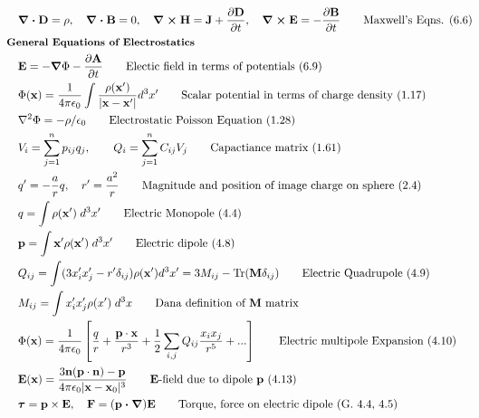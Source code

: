\documentclass[10pt]{article}
\newcommand{\ve}[1]{\boldsymbol{\mathbf{#1}}}
\newcommand{\vect}[1]{\boldsymbol{\mathbf{#1}}}
\newcommand{\vc}[1]{\mathbf{#1}}
\newcommand{\eo}{\epsilon_0}
\newcommand{\pder}[2]{\frac{\partial #1}{\partial #2}}
\newcommand{\K}{\frac{1}{4 \pi \eo}}
\begin{document}
\begin{multicols}{2}
	\tiny
	\setlength{\abovedisplayskip}{-25pt}
	\setlength{\belowdisplayskip}{0pt}
	\setlength{\abovedisplayshortskip}{0pt}
	\setlength{\belowdisplayshortskip}{0pt}
	\begin{align*}
		& \ve{\nabla \cdot D} = \rho, \quad \ve{\nabla \cdot B} = 0, \quad \ve{\nabla \times H} = \ve{J}+\pder{\ve{D}}{t},\quad \ve{\nabla \times E} = - \pder{\ve{B}}{t} \tag*{Maxwell's Eqns. (6.6)}\\
	& \small \hspace{-10pt} \textbf{General Equations of Electrostatics} \small \\
		& \ve{E} = -\ve{\nabla} \Phi - \pder{\ve{A}}{t} \tag*{Electic field in terms of potentials (6.9)} \\
		& \Phi(\vc{x}) = \K \int \frac{\rho (\vc{x}')}{|\vc{x} - \vc{x}'|} d^3 x' \tag*{Scalar potential in terms of charge density (1.17)} \\
		& \nabla^2 \Phi = -\rho/\eo	\tag*{Electrostatic Poisson Equation (1.28)} \\
		& V_i = \sum_{j=1}^{n} p_{ij} q_j,  \qquad Q_i = \sum_{j=1}^{n} C_{ij} V_j  \tag*{Capactiance matrix (1.61)} \\
		& q' = -\frac{a}{r} q, \quad r' = \frac{a^2}{r}		\tag*{Magnitude and position of image charge on sphere (2.4)} \\
		& q = \int \rho(\vect{x}') \; d^3x'	\tag*{Electric Monopole (4.4)} \\
		& \vect{p} = \int \vect{x}' \rho(\vect{x}') \; d^3x'	\tag*{Electric dipole (4.8)} \\
		& Q_{ij} = \int (3 x_i' x_j'- r' \delta_{ij})\rho(\vect{x}') d^3x' = 3 M_{ij} - \text{Tr}(\vect{M} \delta_{ij})		\tag*{Electric Quadrupole (4.9)} \\
		& M_{ij} = \int x_i' x_j' \rho(x') \; d^3 x \tag*{Dana definition of $\ve{M}$ matrix} \\
		&\Phi(\vect{x}) = \K \left[ \frac{q}{r} + \frac{ \vect{p} \cdot \vect{x}}{r^3} + \frac{1}{2} \sum_{i,j} Q_{ij} \frac{x_i x_j}{r^5} + ... \right] \tag*{Electric multipole Expansion (4.10)} \\
		& \vect{E}(\vect{x}) = \frac{3 \vect{n}(\vect{p} \cdot \vect{n}) - \vect{p}}{4 \pi \eo |\vect{x} - \vect{x}_0|^3} \tag*{$\vect{E}$-field due to dipole $\vect{p}$ (4.13)} \\
		& \ve{\tau} = \ve{p} \times \ve{E}, \quad \ve{F} = (\ve{p \cdot \nabla}) \ve{E} \tag*{Torque, force on electric dipole (G. 4.4, 4.5)} \\

\end{align*}
\end{multicols}
\end{document}
